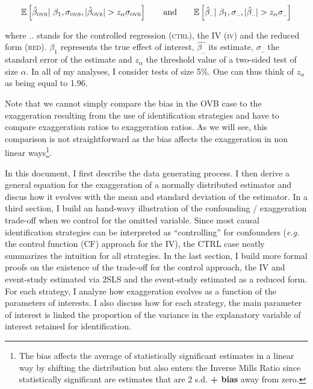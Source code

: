 \documentclass[a4paper, 11pt]{report}
\begin{document}
		 \[ 
		 	\mathbb{E}\left[ \hat{\beta}_{\textsc{ovb}} | \beta_{1}, \sigma_{\textsc{ovb}}, | \hat{\beta}_{\textsc{ovb}} | > z_{\alpha} \sigma_{\textsc{ovb}} \right]
			\qquad \text{and} \qquad
			\mathbb{E}\left[ \hat{\beta}_{..} | \beta_{1}, \sigma_{..}, | \hat{\beta}_{..} | > z_{\alpha} \sigma_{..} \right] 
		\]
			
			where $..$ stands for the controlled regression  (\textsc{ctrl}), the IV (\textsc{iv}) and the reduced form (\textsc{red}). $\beta_{1}$ represents the true effect of interest, $\hat{\beta_{..}}$ its estimate, $\sigma_{..}$ the standard error of the estimate and $z_{\alpha}$ the threshold value of a two-sided test of size $\alpha$. In all of my analyses, I consider tests of size 5\%. One can thus think of $z_{\alpha}$ as being equal to 1.96. %
			
			Note that we cannot simply compare the bias in the OVB case to the exaggeration resulting from the use of identification strategies and have to compare exaggeration ratios to exaggeration ratios. As we will see, this comparison is not straightforward as the bias affects the exaggeration in non linear ways\footnote{The bias affects the average of statistically significant estimates in a linear way by shifting the distribution but also enters the Inverse Mills Ratio since statistically significant are estimates that are 2 s.d. \textbf{+ bias} away from zero.}.
			
			In this document, I first describe the data generating process. I then derive a general equation for the exaggeration of a normally distributed estimator and discus how it evolves with the mean and standard deviation of the estimator. In a third section, I build an hand-wavy illustration of the confounding / exaggeration trade-off when we control for the omitted variable. Since most causal identification strategies can be interpreted as ``controlling'' for confounders (\textit{e.g.} the control function (CF) approach for the IV), the CTRL case neatly summarizes the intuition for all strategies. In the last section, I build more formal proofs on the existence of the trade-off for the control approach, the IV and event-study estimated via 2SLS and the event-study estimated as a reduced form. For each strategy, I analyze how exaggeration evolves as a function of the parameters of interests. I also discuss how for each strategy, the main parameter of interest is linked the proportion of the variance in the explanatory variable of interest retained for identification. 
				
\end{document}
